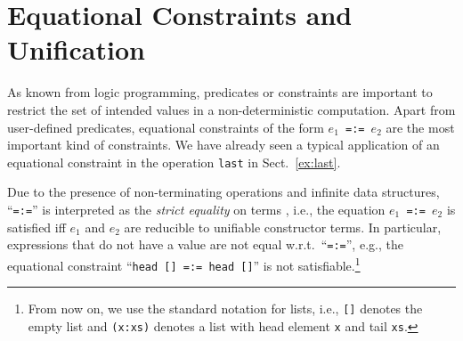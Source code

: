\documentclass{llncs}
\newcommand{\code}[1]{\mbox{\small\texttt{#1}}}
\newcommand{\ccode}[1]{``\code{#1}''}
\begin{document}
\section{Equational Constraints and Unification}
\label{sec:Unification}

As known from logic programming, predicates or constraints
are important to restrict the set of intended values
in a non-deterministic computation.
Apart from user-defined predicates,
equational constraints of the form \code{$e_1$\,=:=\,$e_2$}
are the most important kind of constraints.
We have already seen a typical application
of an equational constraint in the operation
\code{last} in Sect.~\ref{ex:last}.

Due to the presence of non-terminating operations
and infinite data structures,
\ccode{=:=} is interpreted as the \emph{strict equality} on terms
\cite{GiovannettiLeviMoisoPalamidessi91},
i.e., the equation \code{$e_1$\,=:=\,$e_2$} is satisfied iff
$e_1$ and $e_2$ are reducible to unifiable constructor terms.
In particular, expressions that do not have a value
are not equal w.r.t.\ \ccode{=:=}, e.g.,
the equational constraint \ccode{head [] =:= head []}
is not satisfiable.\footnote{From now on, we use the
standard notation for lists, i.e., \code{[]} denotes the empty list
and \code{(x:xs)} denotes a list with head element \code{x}
and tail \code{xs}.}
\end{document}
